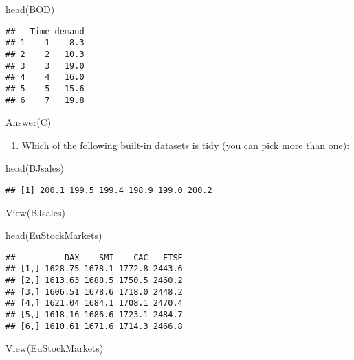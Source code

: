 \documentclass[
]{article}
\newenvironment{Shaded}{\begin{snugshade}}{\end{snugshade}}
\newcommand{\FunctionTok}[1]{\textcolor[rgb]{0.00,0.00,0.00}{#1}}
\newcommand{\NormalTok}[1]{#1}
\providecommand{\tightlist}{%
  \setlength{\itemsep}{0pt}\setlength{\parskip}{0pt}}
\begin{document}
\begin{Shaded}
\begin{Highlighting}[]
\FunctionTok{head}\NormalTok{(BOD)}
\end{Highlighting}
\end{Shaded}

\begin{verbatim}
##   Time demand
## 1    1    8.3
## 2    2   10.3
## 3    3   19.0
## 4    4   16.0
## 5    5   15.6
## 6    7   19.8
\end{verbatim}

Answer(C)

\begin{enumerate}
\def\labelenumi{\arabic{enumi}.}
\setcounter{enumi}{3}
\tightlist
\item
  Which of the following built-in datasets is tidy (you can pick more
  than one):
\end{enumerate}

\begin{Shaded}
\begin{Highlighting}[]
\FunctionTok{head}\NormalTok{(BJsales)}
\end{Highlighting}
\end{Shaded}

\begin{verbatim}
## [1] 200.1 199.5 199.4 198.9 199.0 200.2
\end{verbatim}

\begin{Shaded}
\begin{Highlighting}[]
\FunctionTok{View}\NormalTok{(BJsales)}
\end{Highlighting}
\end{Shaded}

\begin{Shaded}
\begin{Highlighting}[]
\FunctionTok{head}\NormalTok{(EuStockMarkets)}
\end{Highlighting}
\end{Shaded}

\begin{verbatim}
##          DAX    SMI    CAC   FTSE
## [1,] 1628.75 1678.1 1772.8 2443.6
## [2,] 1613.63 1688.5 1750.5 2460.2
## [3,] 1606.51 1678.6 1718.0 2448.2
## [4,] 1621.04 1684.1 1708.1 2470.4
## [5,] 1618.16 1686.6 1723.1 2484.7
## [6,] 1610.61 1671.6 1714.3 2466.8
\end{verbatim}

\begin{Shaded}
\begin{Highlighting}[]
\FunctionTok{View}\NormalTok{(EuStockMarkets)}
\end{Highlighting}
\end{Shaded}
\end{document}
